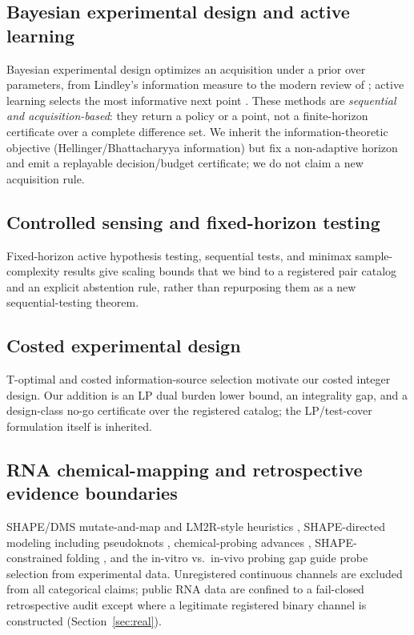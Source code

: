 \documentclass[11pt]{article}
\begin{document}
\subsection{Bayesian experimental design and active learning}
Bayesian experimental design optimizes an acquisition under a prior over parameters, from Lindley's
information measure \citep{lindley1956information} to the modern review of \citet{chaloner1995bayesian};
active learning selects the most informative next point \citep{cohn1996active}. These methods are
\emph{sequential and acquisition-based}: they return a policy or a point, not a finite-horizon
certificate over a complete difference set. We inherit the information-theoretic objective
(Hellinger/Bhattacharyya information) but fix a non-adaptive horizon and emit a replayable
decision/budget certificate; we do not claim a new acquisition rule.

\subsection{Controlled sensing and fixed-horizon testing}
Fixed-horizon active hypothesis testing, sequential tests, and minimax sample-complexity results
\citep{chernoff1959sequential,hoeffding1963probability,wald1945sequential,lai1985asymptotically} give
scaling bounds that we bind to a registered pair catalog and an explicit abstention rule, rather than
repurposing them as a new sequential-testing theorem.

\subsection{Costed experimental design}
T-optimal and costed information-source selection \citep{pukelsheim2006optimal} motivate our costed
integer design. Our addition is an LP dual burden lower bound, an integrality gap, and a design-class
no-go certificate over the registered catalog; the LP/test-cover formulation itself is inherited.

\subsection{RNA chemical-mapping and retrospective evidence boundaries}
SHAPE/DMS mutate-and-map and LM2R-style heuristics \citep{kladwang2011mutate,cordero2012importance,
cheng2015consistent}, SHAPE-directed modeling including pseudoknots \citep{hajdin2013shapeknots},
chemical-probing advances \citep{weeks2010advances}, SHAPE-constrained folding \citep{sloma2016exact},
and the in-vitro vs.\ in-vivo probing gap \citep{leamy2016in-vivo} guide probe selection from
experimental data. Unregistered continuous channels are excluded from all categorical claims; public
RNA data are confined to a fail-closed retrospective audit except where a legitimate registered binary
channel is constructed (Section~\ref{sec:real}).
\end{document}
